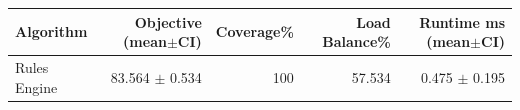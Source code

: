 \begin{tabular}{lrrrr}
\hline
Algorithm & Objective (mean$\pm$CI) & Coverage\% & Load Balance\% & Runtime ms (mean$\pm$CI)\\
\hline
Rules Engine & 83.564 $\pm$ 0.534 & 100 & 57.534 & 0.475 $\pm$ 0.195\\
\hline
\end{tabular}
